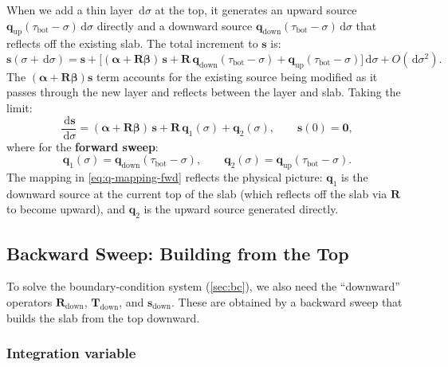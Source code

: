 \documentclass[11pt,a4paper]{article}
\newcommand{\vect}[1]{\bm{#1}}
\newcommand{\mat}[1]{\mathbf{#1}}
\newcommand{\tbot}{\tau_{\mathrm{bot}}}
\newcommand{\dd}{\,\mathrm{d}}
\theoremstyle{definition}
\begin{document}
When we add a thin layer $\dd\sigma$ at the top, it generates an
upward source $\vect{q}_{\mathrm{up}}(\tbot - \sigma)\dd\sigma$ directly
and a downward source $\vect{q}_{\mathrm{down}}(\tbot - \sigma)\dd\sigma$
that reflects off the existing slab.  The total increment to
$\vect{s}$ is:
\begin{equation}
  \vect{s}(\sigma + \dd\sigma)
  = \vect{s}
    + \bigl[(\mat{\alpha} + \mat{R}\mat{\beta})\,\vect{s}
      + \mat{R}\,\vect{q}_{\mathrm{down}}(\tbot - \sigma)
      + \vect{q}_{\mathrm{up}}(\tbot - \sigma)\bigr]\dd\sigma
    + O(\dd\sigma^2).
\end{equation}
The $(\mat{\alpha} + \mat{R}\mat{\beta})\vect{s}$ term accounts for the
existing source being modified as it passes through the new layer and
reflects between the layer and slab.  Taking the limit:
\begin{equation}\label{eq:companion-s}
  \boxed{
    \frac{\dd\vect{s}}{\dd\sigma}
    = (\mat{\alpha} + \mat{R}\mat{\beta})\,\vect{s}
      + \mat{R}\,\vect{q}_1(\sigma) + \vect{q}_2(\sigma),
    \qquad \vect{s}(0) = \vect{0},
  }
\end{equation}
where for the \textbf{forward sweep}:
\begin{equation}\label{eq:q-mapping-fwd}
  \vect{q}_1(\sigma) = \vect{q}_{\mathrm{down}}(\tbot - \sigma),
  \qquad
  \vect{q}_2(\sigma) = \vect{q}_{\mathrm{up}}(\tbot - \sigma).
\end{equation}
The mapping in \eqref{eq:q-mapping-fwd} reflects the physical picture:
$\vect{q}_1$ is the downward source at the current top of the slab
(which reflects off the slab via $\mat{R}$ to become upward), and
$\vect{q}_2$ is the upward source generated directly.

\subsection{Backward Sweep: Building from the Top}\label{sec:backward}

To solve the boundary-condition system (\cref{sec:bc}), we also need the
``downward'' operators $\mat{R}_{\mathrm{down}}$,
$\mat{T}_{\mathrm{down}}$, and $\vect{s}_{\mathrm{down}}$.  These are
obtained by a backward sweep that builds the slab from the top downward.

\subsubsection{Integration variable}
\end{document}
